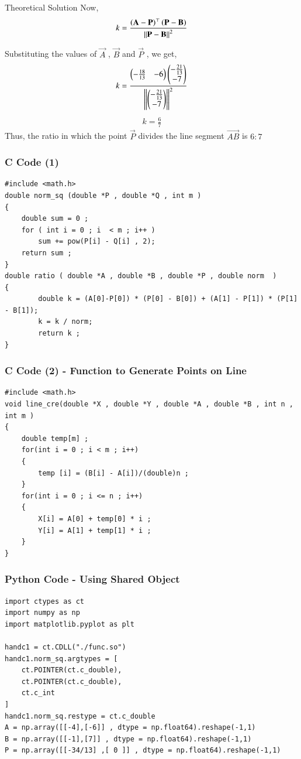 \documentclass{beamer}
\begin{document}
\begin{frame}{Theoretical Solution}
Now, 
\begin{align}
    k = \frac{\left(\mathbf{A} - \mathbf{P}\right)^{\top}\left(\mathbf{P} - \mathbf{B}\right)}{\left\lVert\mathbf{P} - \mathbf{B}\right\rVert^2}
\end{align}

Substituting the values of $\vec{A}$ , $\vec{B}$ and $\vec{P}$ , we get,
\begin{align}
    k = \frac{\begin{pmatrix}-\frac{18}{13}& -6\end{pmatrix} \begin{pmatrix}-\frac{21}{13} \\ -7 \end{pmatrix}}{\left\lVert\begin{pmatrix}-\frac{21}{13} \\ -7\end{pmatrix}\right\rVert^2}
\end{align}
\begin{align}
    k = \frac{6}{7}
\end{align}
Thus,  the ratio in which the point $\vec{P}$ divides the line segment $\vec{AB}$ is $6\colon7$
\end{frame}

\begin{frame}[fragile]
    \frametitle{C Code (1)}

    \begin{lstlisting}
#include <math.h>
double norm_sq (double *P , double *Q , int m )
{
	double sum = 0 ; 
	for ( int i = 0 ; i  < m ; i++ )
		sum += pow(P[i] - Q[i] , 2);
	return sum ;
}
double ratio ( double *A , double *B , double *P , double norm  )
{
		double k = (A[0]-P[0]) * (P[0] - B[0]) + (A[1] - P[1]) * (P[1] - B[1]);
		k = k / norm;
		return k ; 
}
    \end{lstlisting}
\end{frame}

\begin{frame}[fragile]
    \frametitle{C Code (2) - Function to Generate Points on Line}
    \begin{lstlisting}
#include <math.h>
void line_cre(double *X , double *Y , double *A , double *B , int n , int m )
{
	double temp[m] ; 
	for(int i = 0 ; i < m ; i++)
	{
		temp [i] = (B[i] - A[i])/(double)n ; 
	}
	for(int i = 0 ; i <= n ; i++)
	{
		X[i] = A[0] + temp[0] * i ; 
		Y[i] = A[1] + temp[1] * i ;
	}
}

\end{lstlisting}
\end{frame}

\begin{frame}[fragile]
    \frametitle{Python Code - Using Shared Object}
    \begin{lstlisting}
import ctypes as ct
import numpy as np
import matplotlib.pyplot as plt

handc1 = ct.CDLL("./func.so")
handc1.norm_sq.argtypes = [
    ct.POINTER(ct.c_double),
    ct.POINTER(ct.c_double),
    ct.c_int
]
handc1.norm_sq.restype = ct.c_double
A = np.array([[-4],[-6]] , dtype = np.float64).reshape(-1,1)
B = np.array([[-1],[7]] , dtype = np.float64).reshape(-1,1)
P = np.array([[-34/13] ,[ 0 ]] , dtype = np.float64).reshape(-1,1)
\end{lstlisting}
\end{frame}
\end{document}
